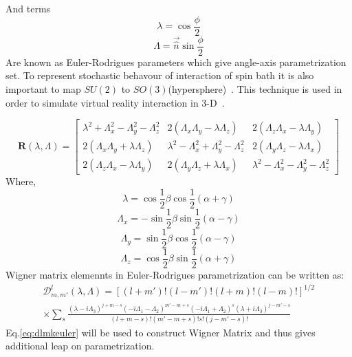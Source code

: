 And terms 
\begin{equation}\label{eq:1911}
\lambda=\cos\frac{\phi}{2}
\end{equation}
\begin{equation}\label{eq:1912}
\Lambda=\vec{\hat{n}}\sin\frac{\phi}{2}
\end{equation}
Are known as Euler-Rodrigues parameters which give angle-axis parametrization set. To represent stochastic behavour of interaction of spin bath it is also important to map $SU(2)$ to $SO(3)$(hypersphere)~\cite{simon}. This technique is used in order to simulate virtual reality interaction in 3-D~\cite{gorsh}.  

\begin{equation}\label{eq:rquatern}
\textbf{R}(\lambda,\Lambda) = \begin{bmatrix}
       \lambda^2+\Lambda_x^2-\Lambda_y^2-\Lambda_z^2 & 2(\Lambda_x\Lambda_y-\lambda\Lambda_z)  & 2(\Lambda_z\Lambda_x-\lambda\Lambda_y)        \\[0.3em]
       2(\Lambda_x\Lambda_y+\lambda\Lambda_z) & \lambda^2-\Lambda_x^2+\Lambda_y^2-\Lambda_z^2 & 2(\Lambda_y\Lambda_z-\lambda\Lambda_x)  \\[0.3em]
        2(\Lambda_z\Lambda_x-\lambda\Lambda_y)& 2(\Lambda_y\Lambda_z+\lambda\Lambda_x) & \lambda^2-\Lambda_x^2-\Lambda_y^2-\Lambda_z^2
     \end{bmatrix}     
\end{equation}
Where,
\begin{equation}\label{eq:1913}
\lambda=\cos\frac{1}{2}\beta\cos\frac{1}{2}(\alpha+\gamma)
\end{equation}
\begin{equation}\label{eq:192}
\Lambda_x=-\sin\frac{1}{2}\beta\sin\frac{1}{2}(\alpha-\gamma)
\end{equation}
\begin{equation}\label{eq:193}
\Lambda_y=\sin\frac{1}{2}\beta\cos\frac{1}{2}(\alpha-\gamma)
\end{equation}
\begin{equation}\label{eq:194}
\Lambda_z=\cos\frac{1}{2}\beta\sin\frac{1}{2}(\alpha+\gamma)
\end{equation}
Wigner matrix elemennts in Euler-Rodrigues parametrization can be written as:
\begin{multline}\label{eq:dlmkeuler}
\mathcal{D}_{m,m'}^l(\lambda,\Lambda)=[(l+m')!(l-m')!(l+m)!(l-m)!]^{1/2}\\ \times \sum_s \frac{(\lambda-i\Lambda_3)^{j+m-s}(-i\Lambda_1-\Lambda_2)^{m'-m+s}(-i\Lambda_1+\Lambda_2)^{s}(\lambda+i\Lambda_3)^{j-m'-s}}{(l+m-s)!(m'-m+s)!s!(j-m'-s)!}
\end{multline}
Eq.\eqref{eq:dlmkeuler} will be used to construct Wigner Matrix and thus gives additional leap on parametrization. 
\clearpage
